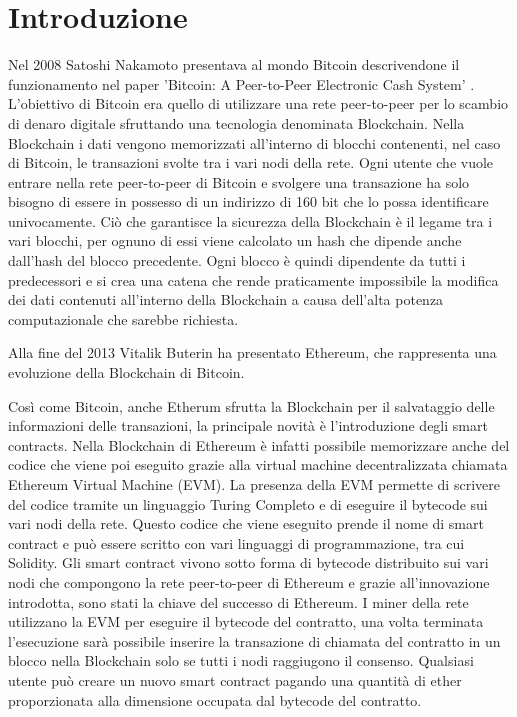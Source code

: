 \documentclass[12pt]{report}
\begin{document}
\newpage\null\thispagestyle{empty}\newpage

\tableofcontents

\chapter{Introduzione}
\fontsize{13pt}{15pt}\selectfont

Nel 2008 Satoshi Nakamoto presentava al mondo Bitcoin descrivendone il funzionamento nel paper 'Bitcoin: A Peer-to-Peer Electronic Cash System' \cite{BitcoinWhitePaper}.
L'obiettivo di Bitcoin era quello di utilizzare una rete peer-to-peer per lo scambio di denaro digitale sfruttando una tecnologia denominata Blockchain. 
Nella Blockchain i dati vengono memorizzati all'interno di blocchi contenenti, nel caso di Bitcoin, le transazioni svolte tra i vari nodi della rete.
Ogni utente che vuole entrare nella rete peer-to-peer di Bitcoin e svolgere una transazione ha solo bisogno di essere in possesso di un  indirizzo di 160 bit che lo possa identificare univocamente.
Ciò che garantisce la sicurezza della Blockchain è il legame tra i vari blocchi, per ognuno di essi viene calcolato un hash che dipende anche dall'hash del blocco precedente.
Ogni blocco è quindi dipendente da tutti i predecessori e si crea una catena che rende praticamente impossibile la modifica dei dati contenuti all'interno della Blockchain a causa dell'alta potenza computazionale che sarebbe richiesta.

Alla fine del 2013 Vitalik Buterin ha presentato Ethereum, che rappresenta una evoluzione della Blockchain di Bitcoin.

Così come Bitcoin, anche Etherum sfrutta la Blockchain per il salvataggio delle informazioni delle transazioni, la principale novità è l'introduzione degli smart contracts.
Nella Blockchain di Ethereum è infatti possibile memorizzare anche del codice che viene poi eseguito grazie alla virtual machine decentralizzata chiamata Ethereum Virtual Machine (EVM).
La presenza della EVM permette di scrivere del codice tramite un linguaggio Turing Completo e di eseguire il bytecode sui vari nodi della rete. Questo codice che viene eseguito prende il nome di smart contract e può essere scritto con vari linguaggi di programmazione, tra cui Solidity.
\newline
Gli smart contract vivono sotto forma di bytecode distribuito sui vari nodi che compongono la rete peer-to-peer di Ethereum e grazie all'innovazione introdotta, sono stati la chiave del successo di Ethereum.
I miner della rete utilizzano la EVM per eseguire il bytecode del contratto, una volta terminata l'esecuzione sarà possibile inserire la transazione di chiamata del contratto in un blocco nella Blockchain solo se tutti i nodi raggiugono il consenso.
Qualsiasi utente può creare un nuovo smart contract pagando una quantità di ether proporzionata alla dimensione occupata dal bytecode del contratto.
\end{document}
